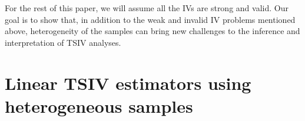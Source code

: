 \documentclass[preprint]{imsart}
\begin{document}
For the rest of this paper, we will assume all the IVs are strong and
valid. Our goal is to show that, in addition to the weak and invalid
IV problems mentioned above, heterogeneity of the samples can bring new
challenges to the inference and interpretation of TSIV analyses.

\section{Linear TSIV estimators using heterogeneous samples}
\label{sec:tsiv-estim-using}





\end{document}

